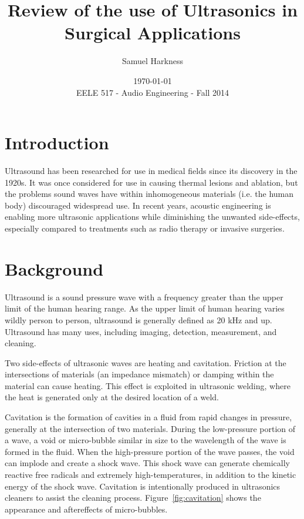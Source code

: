 \documentclass[letter,12pt,titlepage]{article}
\title{Review of the use of Ultrasonics in Surgical Applications}
\author{Samuel Harkness}
\date{\mydate\today\\ EELE 517 - Audio Engineering - Fall 2014}
\begin{document}
\begin{titlepage}
	\maketitle
\end{titlepage}

\section{Introduction}
	
	Ultrasound has been researched for use in medical fields since its discovery in the 1920s. It was once considered for use in causing thermal lesions and ablation, but the problems sound waves have within inhomogeneous materials (i.e. the human body) discouraged widespread use. In recent years, acoustic engineering is enabling more ultrasonic applications while diminishing the unwanted side-effects, especially compared to treatments such as radio therapy or invasive surgeries. \cite{Marquet_2013}

\section{Background}	
	
	Ultrasound is a sound pressure wave with a frequency greater than the upper limit of the human hearing range. As the upper limit of human hearing varies wildly person to person, ultrasound is generally defined as 20 kHz and up. Ultrasound has many uses, including imaging, detection, measurement, and cleaning.
	
	Two side-effects of ultrasonic waves are heating and cavitation. Friction at the intersections of materials (an impedance mismatch) or damping within the material can cause heating. This effect is exploited in ultrasonic welding, where the heat is generated only at the desired location of a weld. \cite{Nichols_1968}
	
	Cavitation is the formation of cavities in a fluid from rapid changes in pressure, generally at the intersection of two materials. During the low-pressure portion of a wave, a void or micro-bubble similar in size to the wavelength of the wave is formed in the fluid. When the high-pressure portion of the wave passes, the void can implode and create a shock wave. This shock wave can generate chemically reactive free radicals and extremely high-temperatures, in addition to the kinetic energy of the shock wave.\cite{Obrien_2000} Cavitation is intentionally produced in ultrasonics cleaners to assist the cleaning process. Figure~\ref{fig:cavitation} shows the appearance and aftereffects of micro-bubbles.
	
\end{document}
